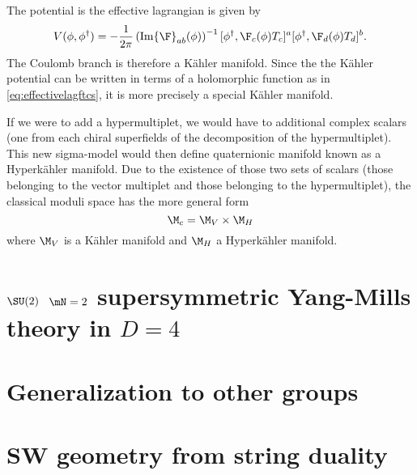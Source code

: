 \documentclass{worksheetclass}
\begin{document}
        The potential is the effective lagrangian is given by
        \begin{equation}
            V(\phi,\phi^\dagger)=-\frac{1}{2\pi}\left(\Im\F_{ab}(\phi)\right)^{-1}[\phi^\dagger,\F_c(\phi)T_c]^a[\phi^\dagger,\F_d(\phi)T_d]^b.
        \end{equation}
        The Coulomb branch is therefore a Kähler manifold. Since the the Kähler potential can be written in terms of a holomorphic function as in \eqref{eq:effectivelagftcs}, it is more precisely a special Kähler manifold.

        If we were to add a hypermultiplet, we would have to additional complex scalars (one from each chiral superfields of the decomposition of the hypermultiplet). This new sigma-model would then define quaternionic manifold known as a Hyperkähler manifold. Due to the existence of those two sets of scalars (those belonging to the vector multiplet and those belonging to the hypermultiplet), the classical moduli space has the more general form
        \begin{equation}
            \M_c=\M_V\times\M_H
        \end{equation}
        where $\M_V$ is a Kähler manifold and $\M_H$ a Hyperkähler manifold.


    \section{$\SU(2)$ $\mN=2$ supersymmetric Yang-Mills theory in $D=4$}

    

\section{Generalization to other groups}

\section{SW geometry from string duality}



\printbibliography
\end{document}
